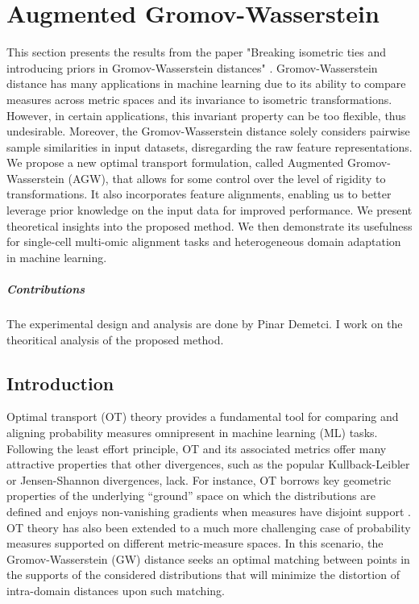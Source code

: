 
\chapter[Augmented Gromov-Wasserstein]{Augmented Gromov-Wasserstein}

\renewcommand{\contentsname}{Contents}
\localtableofcontents*
{}

\hfill \break
This section presents the results from the paper "Breaking isometric ties and introducing priors
in Gromov-Wasserstein distances" \citep{Demetci23}.
Gromov-Wasserstein distance has many applications in machine learning due to its ability
to compare measures across metric spaces and its invariance to isometric transformations. However,
in certain applications, this invariant property can be too flexible, thus undesirable. Moreover,
the Gromov-Wasserstein distance solely considers pairwise sample similarities in input datasets,
disregarding the raw feature representations. We propose a new optimal transport formulation,
called Augmented Gromov-Wasserstein (AGW), that allows for some control over the
level of rigidity to transformations. It also incorporates feature alignments,
enabling us to better leverage prior knowledge on the input data for improved performance.
We present theoretical insights into the proposed method. We then demonstrate its usefulness
for single-cell multi-omic alignment tasks and heterogeneous domain adaptation in machine learning.

\paragraph{Contributions} The experimental design and analysis are done by Pinar Demetci.
I work on the theoritical analysis of the proposed method.

\raggedbottom

\section{Introduction}

Optimal transport (OT) theory provides a fundamental tool for comparing and
aligning probability measures omnipresent in machine learning (ML) tasks.
Following the least effort principle, OT and its associated metrics offer
many attractive properties that other divergences, such as the popular Kullback-Leibler or
Jensen-Shannon divergences, lack. For instance, OT borrows key geometric properties of
the underlying ``ground'' space on which the distributions are defined \citep{Villani03}
and enjoys non-vanishing gradients when measures have disjoint support \citep{Arjovsky17}.
OT theory has also been extended to a much more challenging case of probability measures supported
on different metric-measure spaces. In this scenario, the Gromov-Wasserstein (GW) distance
seeks an optimal matching between points in the supports of the considered distributions
that will minimize the distortion of intra-domain distances upon such matching.

